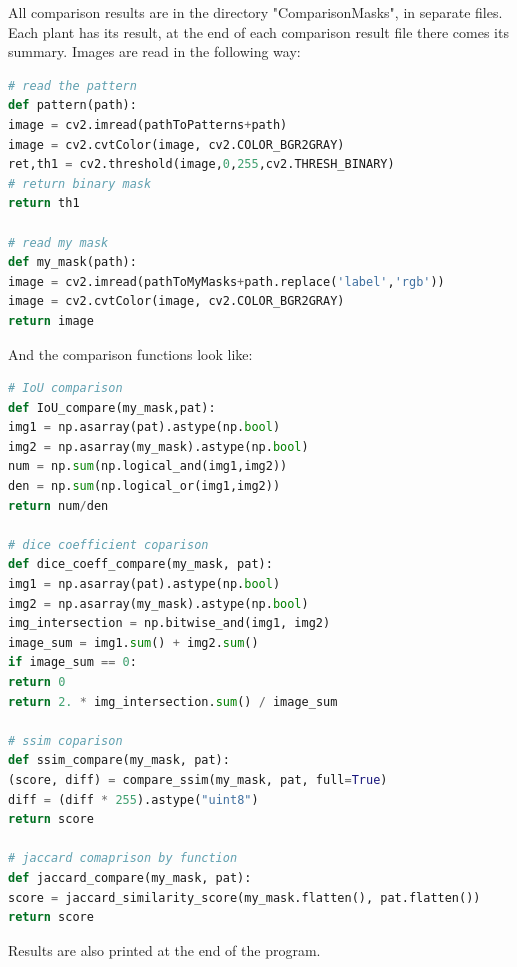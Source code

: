 \documentclass[12pt]{article}
\begin{document}
All comparison results are in the directory "ComparisonMasks", in separate files.
Each plant has its result, at the end of each comparison result file there comes its summary. Images are read in the following way:

\newpage

\begin{lstlisting}[language=Python]
# read the pattern
def pattern(path):
image = cv2.imread(pathToPatterns+path)
image = cv2.cvtColor(image, cv2.COLOR_BGR2GRAY)
ret,th1 = cv2.threshold(image,0,255,cv2.THRESH_BINARY)
# return binary mask
return th1

# read my mask
def my_mask(path):
image = cv2.imread(pathToMyMasks+path.replace('label','rgb'))
image = cv2.cvtColor(image, cv2.COLOR_BGR2GRAY)
return image
\end{lstlisting}

And the comparison functions look like:

\begin{lstlisting}[language=Python]
# IoU comparison
def IoU_compare(my_mask,pat):
img1 = np.asarray(pat).astype(np.bool)
img2 = np.asarray(my_mask).astype(np.bool)
num = np.sum(np.logical_and(img1,img2))
den = np.sum(np.logical_or(img1,img2))
return num/den

# dice coefficient coparison
def dice_coeff_compare(my_mask, pat):
img1 = np.asarray(pat).astype(np.bool)
img2 = np.asarray(my_mask).astype(np.bool)
img_intersection = np.bitwise_and(img1, img2)
image_sum = img1.sum() + img2.sum()
if image_sum == 0:
return 0
return 2. * img_intersection.sum() / image_sum

# ssim coparison
def ssim_compare(my_mask, pat):
(score, diff) = compare_ssim(my_mask, pat, full=True)
diff = (diff * 255).astype("uint8")
return score

# jaccard comaprison by function
def jaccard_compare(my_mask, pat):
score = jaccard_similarity_score(my_mask.flatten(), pat.flatten())
return score
\end{lstlisting}

\newpage

Results are also printed at the end of the program.
\end{document}
